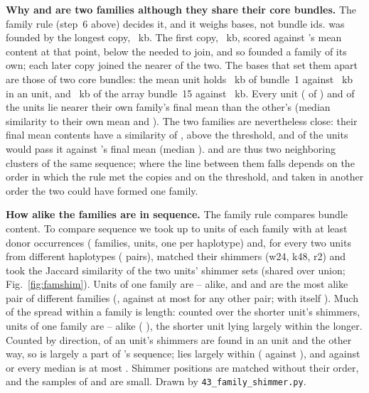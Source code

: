 \textbf{Why  and  are two families although they share their core bundles.} The family rule (step~6
above) decides it, and it weighs bases, not bundle ids.  was founded by the longest copy, \ufAfoundKb~kb. The
first  copy, \ufBfoundKb~kb, scored \ufBfoundSim{} against 's mean content at that point, below the \ufJac{}
needed to join, and so founded a family of its own; each later copy joined the nearer of the two. The bases that set
them apart are those of two core bundles: the mean  unit holds \ufMeanOneA~kb of bundle~1 against \ufMeanOneB~kb in
an  unit, and \ufMeanArrA~kb of the array bundle~15 against \ufMeanArrB~kb. Every  unit (\ufBcloser{} of
\ufBn) and \ufAcloser{} of the \ufAn{}  units lie nearer their own family's final mean than the other's (median
similarity to their own mean \ufAownSim{} and \ufBownSim). The two families are nevertheless close: their final mean
contents have a similarity of \ufMeansSim, above the threshold, and \ufBgeThr{} of the \ufBn{}  units would pass it
against 's final mean (median \ufBvsASim).  and  are thus two neighboring clusters of the same
sequence; where the line between them falls depends on the order in which the rule met the copies and on the
threshold, and taken in another order the two could have formed one family.

\textbf{How alike the families are in sequence.} The family rule compares bundle content. To compare sequence we took up
to \fsN{} units of each family with at least \fsMinOcc{} donor occurrences (\fsFams{} families, \fsUnits{} units, one per
haplotype) and, for every two units from different haplotypes (\fsPairs{} pairs), matched their shimmers (w24, k48,
r2) and took the Jaccard similarity of the two units' shimmer sets (shared over union; Fig.~\ref{fig:famshim}). Units
of one family are \fsJDiagLo--\fsJDiagHi{} alike, and  and  are the most alike pair of different families
(\fsJAB, against at most \fsJOtherMax{} for any other pair;  with itself \fsJBB). Much of the spread within a
family is length: counted over the shorter unit's shimmers, units of one family are \fsODiagLo--\fsODiagHi{} alike
( \fsOBB), the shorter unit lying largely within the longer. Counted by direction, \fsCBA{} of an  unit's
shimmers are found in an  unit and \fsCAB{} the other way, so  is largely a part of 's sequence;
 lies largely within  (\fsCDC{} against \fsCCD), and against  or  every median is at most
\fsDABMax. Shimmer positions are matched without their order, and the samples of  and  are small. Drawn by \texttt{43\_family\_shimmer.py}.

